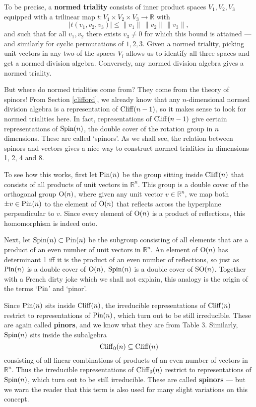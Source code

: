 \documentclass[12pt]{article}
\newcommand\R{{\mathbb R}}
\newcommand{\Cliff}{{\rm Cliff}}
\newcommand{\OO}{{\rm O}}
\newcommand{\SO}{{\rm SO}}
\newcommand{\Spin}{{\rm Spin}}
\newcommand{\Pin}{{\rm Pin}}
\newcommand{\maps}{\colon}
\begin{document}
To be precise, a {\bf normed triality} consists of inner product  
spaces $V_1, V_2, V_3$ equipped with a trilinear map   
$t \maps V_1 \times V_2 \times V_3 \to \R$ with  
\[      |t(v_1, v_2, v_3)| \le \|v_1\| \, \|v_2\| \, \|v_3 \|,   \]    
and such that for all $v_1, v_2$ there exists $v_3 \ne 0$ for which this   
bound is attained --- and similarly for cyclic permutations of $1,2,3$.    
Given a normed triality, picking unit vectors in any two of the spaces 
$V_i$ allows us to identify all three spaces and get a normed division 
algebra.  Conversely, any normed division algebra gives a normed triality.    
  
But where do normed trialities come from?  They come from the theory of  
spinors!  From Section \ref{clifford}, we already know that any  
$n$-dimensional normed division algebra is a representation of  
$\Cliff(n-1)$, so it makes sense to look for normed trialities here. 
In fact, representations of $\Cliff(n-1)$ give certain representations  
of $\Spin(n)$, the double cover of the rotation group in $n$ dimensions.  
These are called `spinors'.  As we shall see, the relation between   
spinors and vectors gives a nice way to construct normed trialities in  
dimensions 1, 2, 4 and 8.  
  
To see how this works, first let $\Pin(n)$ be the group sitting inside  
$\Cliff(n)$ that consists of all products of unit vectors in $\R^n$.  
This group is a double cover of the orthogonal group $\OO(n)$, where  
given any unit vector $v \in \R^n$, we map both $\pm v \in \Pin(n)$ to  
the element of $\OO(n)$ that reflects across the hyperplane perpendicular to  
$v$.  Since every element of $\OO(n)$ is a product of reflections, this  
homomorphism is indeed onto.      
  
Next, let $\Spin(n) \subset \Pin(n)$ be the subgroup consisting of all  
elements that are a product of an even number of unit vectors in  
$\R^n$.  An element of $\OO(n)$ has determinant 1 iff it is the product  
of an even number of reflections, so just as $\Pin(n)$ is a double cover  
of $\OO(n)$, $\Spin(n)$ is a double cover of $\SO(n)$.  Together with a  
French dirty joke which we shall not explain, this analogy is the origin  
of the terms `$\Pin$' and `pinor'.    
  
Since $\Pin(n)$ sits inside $\Cliff(n)$, the irreducible representations
of $\Cliff(n)$ restrict to representations of $\Pin(n)$, which turn out
to be still irreducible.  These are again called {\bf pinors}, and we
know what they are from Table 3.  Similarly, $\Spin(n)$ sits inside the
subalgebra
\[            \Cliff_0(n) \subseteq \Cliff(n) \]  
consisting of all linear combinations of products of an even number of
vectors in $\R^n$.  Thus the irreducible representations of
$\Cliff_0(n)$ restrict to representations of $\Spin(n)$, which turn out
to be still irreducible.  These are called {\bf spinors} --- but we warn
the reader that this term is also used for many slight variations on
this concept.
  
\end{document}
